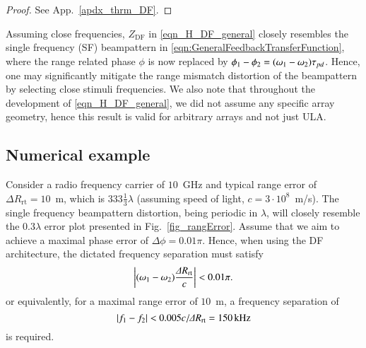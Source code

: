 \begin{proof}
See App.~\ref{apdx_thrm_DF}. 
\end{proof}
\par Assuming close frequencies, $Z_{\text{DF}}$ in  \eqref{eqn_H_DF_general} closely resembles the single frequency (SF) beampattern in  \eqref{eqn:GeneralFeedbackTransferFunction}, where the range related phase $\phi$ is now replaced by  $\phi_{1}-\phi_{2}=(\omega_1-\omega_2)\tau_{pd}$. 
Hence, one may significantly mitigate the range mismatch distortion of the beampattern by selecting close stimuli frequencies.
We also note that throughout the development of \eqref{eqn_H_DF_general}, we did not assume any specific array geometry, hence this result is valid for arbitrary arrays and not just ULA.
\subsection*{Numerical example}
Consider a radio frequency carrier of $10$~GHz and typical range error of $\Delta{}R_{\text{rt}}=10$~m, which is $333\frac{1}{3}\lambda$ (assuming  speed of light, $c=3\cdot 10^{8}$~m/s). The single frequency beampattern distortion, being periodic in $\lambda$, will closely resemble the $0.3\lambda$ error plot presented in Fig.~\ref{fig_rangError}. Assume that we aim to achieve a maximal phase error of $\Delta \phi=0.01\pi$. Hence, when using the DF architecture, the dictated frequency separation must satisfy
\begin{equation}\label{eq_DF_phErr}
\abs{(\omega_1-\omega_2)\frac{\Delta{}R_{\text{rt}}}{c}}<0.01\pi.
\end{equation}
or equivalently, for a maximal range error of $10$~m, a frequency separation of
\[
\left\vert f_1-f_2\right\vert<0.005 c/\Delta{}R_{\text{rt}}=150 \,\text{kHz}
\]
is required. 

